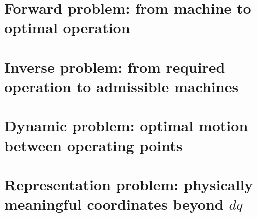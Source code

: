 \documentclass[11pt,a4paper]{article}
\begin{document}
\maketitle
\begin{abstract}
\PaperAbstract
\end{abstract}
\tableofcontents

\part{Forward problem: from machine to optimal operation}
















\part{Inverse problem: from required operation to admissible machines}







\part{Dynamic problem: optimal motion between operating points}











\part{Representation problem: physically meaningful coordinates beyond \texorpdfstring{$dq$}{dq}}










\end{document}
